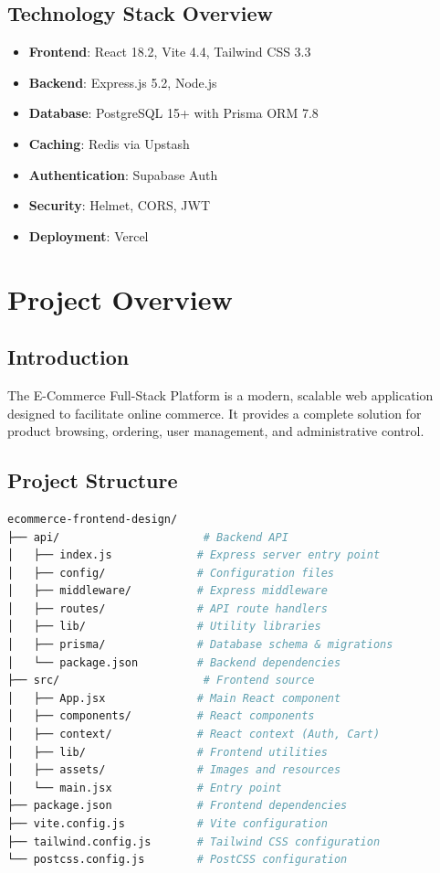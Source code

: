 \documentclass[12pt,a4paper]{report}
\begin{document}
\section{Technology Stack Overview}

\begin{itemize}
    \item \textbf{Frontend}: React 18.2, Vite 4.4, Tailwind CSS 3.3
    \item \textbf{Backend}: Express.js 5.2, Node.js
    \item \textbf{Database}: PostgreSQL 15+ with Prisma ORM 7.8
    \item \textbf{Caching}: Redis via Upstash
    \item \textbf{Authentication}: Supabase Auth
    \item \textbf{Security}: Helmet, CORS, JWT
    \item \textbf{Deployment}: Vercel
\end{itemize}

\newpage

\chapter{Project Overview}

\section{Introduction}

The E-Commerce Full-Stack Platform is a modern, scalable web application designed to facilitate online commerce. It provides a complete solution for product browsing, ordering, user management, and administrative control.

\section{Project Structure}

\begin{lstlisting}[language=bash, caption=Project Directory Structure]
ecommerce-frontend-design/
├── api/                      # Backend API
│   ├── index.js             # Express server entry point
│   ├── config/              # Configuration files
│   ├── middleware/          # Express middleware
│   ├── routes/              # API route handlers
│   ├── lib/                 # Utility libraries
│   ├── prisma/              # Database schema & migrations
│   └── package.json         # Backend dependencies
├── src/                      # Frontend source
│   ├── App.jsx              # Main React component
│   ├── components/          # React components
│   ├── context/             # React context (Auth, Cart)
│   ├── lib/                 # Frontend utilities
│   ├── assets/              # Images and resources
│   └── main.jsx             # Entry point
├── package.json             # Frontend dependencies
├── vite.config.js           # Vite configuration
├── tailwind.config.js       # Tailwind CSS configuration
└── postcss.config.js        # PostCSS configuration
\end{lstlisting}
\end{document}
